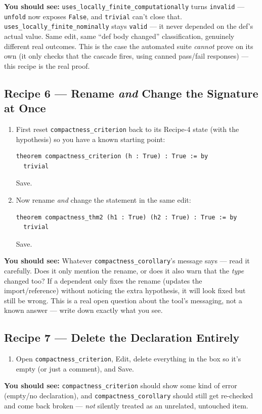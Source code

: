 \documentclass[11pt]{article}
\newcommand{\code}[1]{\texttt{#1}}
\newcommand{\see}[1]{\textbf{You should see:} #1}
\begin{document}
\see{\code{uses\_locally\_finite\_computationally} turns \code{invalid} ---
\code{unfold} now exposes \code{False}, and \code{trivial} can't close that.
\code{uses\_locally\_finite\_nominally} stays \code{valid} --- it never
depended on the def's actual value. Same edit, same ``def body changed''
classification, genuinely different real outcomes. This is the case the
automated suite \emph{cannot} prove on its own (it only checks that the
cascade fires, using canned pass/fail responses) --- this recipe is the real
proof.}

\subsection*{Recipe 6 --- Rename \emph{and} Change the Signature at Once}
\begin{enumerate}[label=\arabic*.]
  \item First reset \code{compactness\_criterion} back to its Recipe-4 state
    (with the hypothesis) so you have a known starting point:
\begin{verbatim}
theorem compactness_criterion (h : True) : True := by
  trivial
\end{verbatim}
    Save.
  \item Now rename \emph{and} change the statement in the same edit:
\begin{verbatim}
theorem compactness_thm2 (h1 : True) (h2 : True) : True := by
  trivial
\end{verbatim}
    Save.
\end{enumerate}
\see{Whatever \code{compactness\_corollary}'s message says --- read it
carefully. Does it only mention the rename, or does it also warn that the
\emph{type} changed too? If a dependent only fixes the rename (updates the
import/reference) without noticing the extra hypothesis, it will look fixed
but still be wrong. This is a real open question about the tool's messaging,
not a known answer --- write down exactly what you see.}

\subsection*{Recipe 7 --- Delete the Declaration Entirely}
\begin{enumerate}[label=\arabic*.]
  \item Open \code{compactness\_criterion}, Edit, delete everything in the
    box so it's empty (or just a comment), and Save.
\end{enumerate}
\see{\code{compactness\_criterion} should show some kind of error (empty/no
declaration), and \code{compactness\_corollary} should still get re-checked
and come back broken --- \emph{not} silently treated as an unrelated,
untouched item.}
\end{document}
